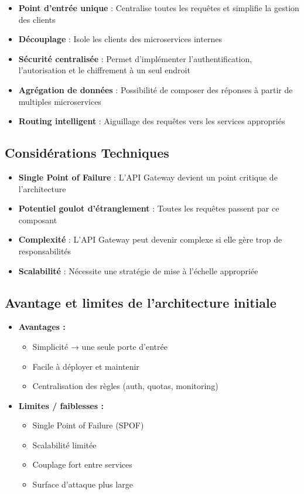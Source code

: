 \documentclass[11pt,a4paper]{article}
\begin{document}
\begin{itemize}
    \item \textbf{Point d'entrée unique} : Centralise toutes les requêtes et simplifie la gestion des clients
    \item \textbf{Découplage} : Isole les clients des microservices internes
    \item \textbf{Sécurité centralisée} : Permet d'implémenter l'authentification, l'autorisation et le chiffrement à un seul endroit
    \item \textbf{Agrégation de données} : Possibilité de composer des réponses à partir de multiples microservices
    \item \textbf{Routing intelligent} : Aiguillage des requêtes vers les services appropriés
\end{itemize}

\subsection*{Considérations Techniques}

\begin{itemize}
    \item \textbf{Single Point of Failure} : L'API Gateway devient un point critique de l'architecture
    \item \textbf{Potentiel goulot d'étranglement} : Toutes les requêtes passent par ce composant
    \item \textbf{Complexité} : L'API Gateway peut devenir complexe si elle gère trop de responsabilités
    \item \textbf{Scalabilité} : Nécessite une stratégie de mise à l'échelle appropriée
\end{itemize}
\subsection{Avantage et limites de l'architecture initiale}
\begin{itemize}
    \item \textbf{Avantages :}
    \begin{itemize}
        \item Simplicité → une seule porte d’entrée
        \item Facile à déployer et maintenir
        \item Centralisation des règles (auth, quotas, monitoring)
    \end{itemize}
    \item \textbf{Limites / faiblesses :}
    \begin{itemize}
        \item Single Point of Failure (SPOF)
        \item Scalabilité limitée
        \item Couplage fort entre services
        \item Surface d’attaque plus large
    \end{itemize}
\end{itemize}
\end{document}
